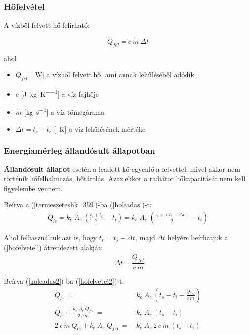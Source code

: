 \subsubsection{Hőfelvétel}
A vízből felvett hő felírható:

\begin{equation} \label{hofelvetel}
\dot Q_{fel} = c ~ \dot{m} ~ \Delta t
\end{equation}

ahol

\begin{itemize}[itemsep=6pt,topsep=0pt,parsep=0pt,partopsep=0pt]
	\item[] $\dot{Q}_{fel}$ [\SI{}{\watt}] a vízből felvett hő, ami annak lehűléséből adódik
	\item[] $c$ [\si[per-mode = fraction]{\joule\per\kg\per\kelvin}] a víz fajhője
	\item[] $\dot{m}$ [\si[per-mode = fraction]{\kg\per\second}] a víz tömegárama
	\item[] $\Delta t = t_s-t_r$ [\SI{}{\kelvin}] a víz lehűlésének mértéke
\end{itemize}

\subsubsection{Energiamérleg állandósult állapotban}
\textbf{Állandósult állapot} esetén a leadott hő egyenlő a felvettel, mivel akkor nem történik hőfelhalmozás, hőtárolás.
Azaz ekkor a radiátor hőkapacitását nem kell figyelembe vennem.

Beírva a (\ref{termeszeteshk_359})-ba (\ref{holeadas})-t:
\begin{equation} \label{holeadas2}
\begin{aligned}
\dot Q_{le} = k_e ~ A_e ~ \left( \frac{t_s+t_r}{2}-t_i\right) = k_e ~ A_e ~ \left( \frac{t_s+(t_s-\Delta t)}{2}-t_i\right)
\end{aligned}
\end{equation}

Ahol felhasználtuk azt is, hogy $t_r = t_s-\Delta t$, majd $\Delta t$ helyére beírhatjuk a (\ref{hofelvetel})  átrendezett alakját:
\begin{equation} \label{hofelvetel2}
~~\Delta t = \frac{\dot Q_{fel}}{c ~ \dot{m}}
\end{equation}

Beírva (\ref{holeadas2})-ba (\ref{hofelvetel2})-t:
\begin{equation} \label{holeadas3}
\begin{aligned}
\dot Q_{le} ~=~ & k_e ~ A_e ~ \left( t_s-t_i-\frac{\dot Q_{fel}}{c ~ \dot{m}}\right)  \\[18pt]
\dot Q_{le} + \frac{k_e ~ A_e ~ \dot Q_{fel}}{2 ~ c ~ \dot{m}} ~ = ~ & k_e ~ A_e ~(t_s-t_i) \\[24pt]
2 ~ c ~ \dot{m} ~ \dot Q_{le} + k_e ~ A_e ~ \dot Q_{fel} ~ = ~ &  k_e ~ A_e ~ 2~ c~ \dot{m} ~(t_s-t_i)
\end{aligned}
\end{equation}

